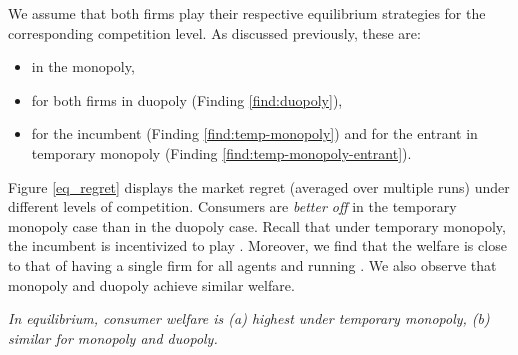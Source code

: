 \documentclass[../competing_bandits_with_appendix.tex]{subfiles}
\begin{document}
We assume that both firms play their respective equilibrium strategies for the corresponding competition level. As discussed previously, these are:
\begin{itemize}
\item \DG in the monopoly,
\item \DG for both firms in duopoly (Finding \ref{find:duopoly}),
\item \TS for the incumbent (Finding \ref{find:temp-monopoly}) and \DG for the entrant in temporary monopoly (Finding \ref{find:temp-monopoly-entrant}).
\end{itemize}

Figure \ref{eq_regret} displays the market regret (averaged
  over multiple runs) under different levels of competition.
Consumers are \textit{better off} in the temporary monopoly case than in
the duopoly case. Recall that under temporary monopoly, the incumbent is incentivized to play \TS. Moreover, we find that the welfare is close to that of having a single firm for all agents and running \TS. We also observe that monopoly and duopoly achieve similar welfare.

\begin{finding}\label{find:welfare}
\textit{In equilibrium, consumer welfare is (a) highest under temporary monopoly, (b) similar for monopoly and duopoly.
}
\end{finding}
\end{document}
